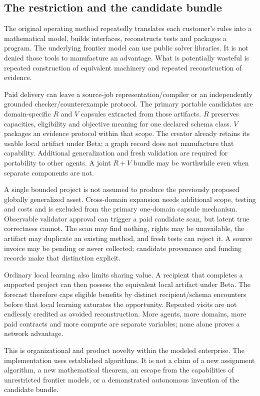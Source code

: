 \documentclass[11pt,letterpaper]{article}
\begin{document}
\subsection{The restriction and the candidate bundle}
The original operating method repeatedly translates each customer's rules into a mathematical model, builds interfaces, reconstructs tests and packages a program. The underlying frontier model can use public solver libraries. It is not denied those tools to manufacture an advantage. What is potentially wasteful is repeated construction of equivalent machinery and repeated reconstruction of evidence.

Paid delivery can leave a source-job representation/compiler or an independently grounded checker/counterexample protocol. The primary portable candidates are domain-specific $R$ and $V$ capsules extracted from those artifacts. $R$ preserves capacities, eligibility and objective meaning for one declared schema class. $V$ packages an evidence protocol within that scope. The creator already retains its usable local artifact under Beta; a graph record does not manufacture that capability. Additional generalization and fresh validation are required for portability to other agents. A joint $R+V$ bundle may be worthwhile even when separate components are not.

A single bounded project is not assumed to produce the previously proposed globally generalized asset. Cross-domain expansion needs additional scope, testing and costs and is excluded from the primary one-domain capsule mechanism. Observable validator approval can trigger a paid candidate scan, but latent true correctness cannot. The scan may find nothing, rights may be unavailable, the artifact may duplicate an existing method, and fresh tests can reject it. A source invoice may be pending or never collected; candidate provenance and funding records make that distinction explicit.

Ordinary local learning also limits sharing value. A recipient that completes a supported project can then possess the equivalent local artifact under Beta. The forecast therefore caps eligible benefits by distinct recipient/schema encounters before that local learning saturates the opportunity. Repeated visits are not endlessly credited as avoided reconstruction. More agents, more domains, more paid contracts and more compute are separate variables; none alone proves a network advantage.

This is organizational and product novelty within the modeled enterprise. The implementation uses established algorithms. It is not a claim of a new assignment algorithm, a new mathematical theorem, an escape from the capabilities of unrestricted frontier models, or a demonstrated autonomous invention of the candidate bundle.
\end{document}
